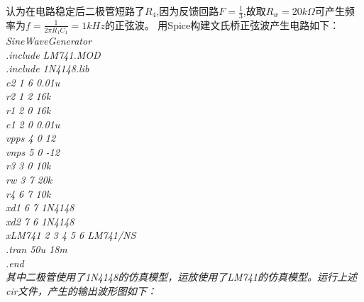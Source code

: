 ﻿\documentclass[10.5pt]{ctexart}
\begin{document}
\title{\textbf{}} %
\author{}
\maketitle
\section{\textbf{}}
认为在电路稳定后二极管短路了$R_4$,因为反馈回路$F=\frac{1}{3}$,故取$R_w=20k\Omega$可产生频率为$f=\frac{1}{2\pi R_1C_1}=1kHz$的正弦波。
用Spice构建文氏桥正弦波产生电路如下：\\
\itshape 
SineWaveGenerator\\
.include LM741.MOD\\
.include 1N4148.lib\\
c2 1 6 0.01u\\
r2 1 2 16k\\
r1 2 0 16k\\
c1 2 0 0.01u\\
vpps 4 0 12\\
vnps 5 0 -12\\
r3 3 0 10k\\
rw 3 7 \colorbox{darkyellow}{20k}\\
r4 6 7 10k\\
xd1 6 7 1N4148\\
xd2 7 6 1N4148\\
xLM741 2 3 4 5 6 LM741/NS\\
.tran 50u 18m\\
.end\\
\upshape
其中二极管使用了1N4148的仿真模型，运放使用了LM741的仿真模型。运行上述cir文件，产生的输出波形图如下：
\newpage
\end{document}
